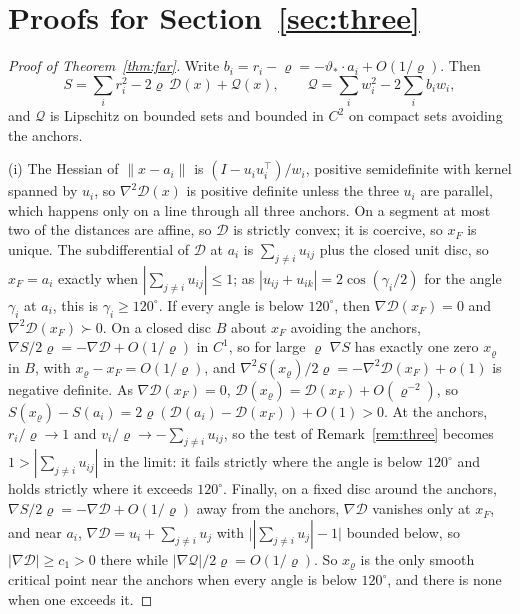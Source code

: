 \section{Proofs for Section~\ref{sec:three}}\label{app:three}

\begin{proof}[Proof of Theorem~\ref{thm:far}]
Write $b_i = r_i - \varrho = -\vartheta_*\cdot a_i + O(1/\varrho)$. Then
\[ S = \sum_i r_i^2 - 2\varrho\,\mathcal D(x) + \mathcal Q(x), \qquad \mathcal Q = \sum_i w_i^2 - 2\sum_i b_iw_i , \]
and $\mathcal Q$ is Lipschitz on bounded sets and bounded in $C^2$ on compact sets avoiding the anchors.

(i) The Hessian of $\|x - a_i\|$ is $(I - u_iu_i^\top)/w_i$, positive semidefinite with kernel spanned by $u_i$, so
$\nabla^2\mathcal D(x)$ is positive definite unless the three $u_i$ are parallel, which happens only on a line through all
three anchors. On a segment at most two of the distances are affine, so $\mathcal D$ is strictly convex; it is coercive, so
$x_F$ is unique. The subdifferential of $\mathcal D$ at $a_i$ is $\sum_{j \ne i}u_{ij}$ plus the closed unit disc, so
$x_F = a_i$ exactly when $|\sum_{j \ne i}u_{ij}| \le 1$; as $|u_{ij} + u_{ik}| = 2\cos(\gamma_i/2)$ for the angle $\gamma_i$ at
$a_i$, this is $\gamma_i \ge 120^\circ$. If every angle is below $120^\circ$, then $\nabla\mathcal D(x_F) = 0$ and
$\nabla^2\mathcal D(x_F) \succ 0$. On a closed disc $B$ about $x_F$ avoiding the anchors, $\nabla S/2\varrho = -\nabla\mathcal D +
O(1/\varrho)$ in $C^1$, so for large $\varrho$ $\nabla S$ has exactly one zero $x_\varrho$ in $B$, with $x_\varrho - x_F = O(1/\varrho)$, and
$\nabla^2S(x_\varrho)/2\varrho = -\nabla^2\mathcal D(x_F) + o(1)$ is negative definite. As $\nabla\mathcal D(x_F) = 0$,
$\mathcal D(x_\varrho) = \mathcal D(x_F) + O(\varrho^{-2})$, so $S(x_\varrho) - S(a_i) = 2\varrho(\mathcal D(a_i) - \mathcal D(x_F)) + O(1) > 0$.
At the anchors, $r_i/\varrho \to 1$ and $v_i/\varrho \to -\sum_{j \ne i}u_{ij}$, so the test of Remark~\ref{rem:three} becomes
$1 > |\sum_{j \ne i}u_{ij}|$ in the limit: it fails strictly where the angle is below $120^\circ$ and holds strictly where it
exceeds $120^\circ$. Finally, on a fixed disc around the anchors, $\nabla S/2\varrho = -\nabla\mathcal D + O(1/\varrho)$ away from
the anchors, $\nabla\mathcal D$ vanishes only at $x_F$, and near $a_i$, $\nabla\mathcal D = u_i + \sum_{j \ne i}u_j$ with
$\bigl||\sum_{j \ne i}u_j| - 1\bigr|$ bounded below, so $|\nabla\mathcal D| \ge c_1 > 0$ there while
$|\nabla\mathcal Q|/2\varrho = O(1/\varrho)$. So $x_\varrho$ is the only smooth critical point near the anchors when every angle
is below $120^\circ$, and there is none when one exceeds it.


\end{proof}
